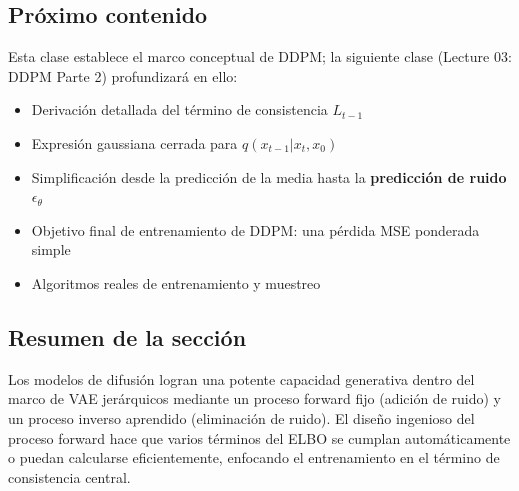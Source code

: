 \subsection{Próximo contenido}

Esta clase establece el marco conceptual de DDPM; la siguiente clase (Lecture 03: DDPM Parte 2) profundizará en ello:

\begin{itemize}
    \item Derivación detallada del término de consistencia $L_{t-1}$
    \item Expresión gaussiana cerrada para $q(x_{t-1}|x_t, x_0)$
    \item Simplificación desde la predicción de la media hasta la \textbf{predicción de ruido} $\epsilon_\theta$
    \item Objetivo final de entrenamiento de DDPM: una pérdida MSE ponderada simple
    \item Algoritmos reales de entrenamiento y muestreo
\end{itemize}

\subsection{Resumen de la sección}

Los modelos de difusión logran una potente capacidad generativa dentro del marco de VAE jerárquicos mediante un proceso forward fijo (adición de ruido) y un proceso inverso aprendido (eliminación de ruido). El diseño ingenioso del proceso forward hace que varios términos del ELBO se cumplan automáticamente o puedan calcularse eficientemente, enfocando el entrenamiento en el término de consistencia central.
